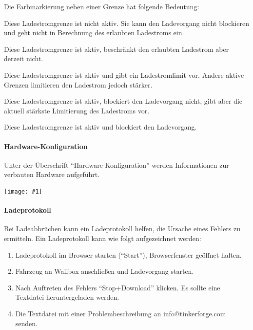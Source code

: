 \documentclass[a4paper,10pt]{article}
\newcommand{\gfx}[1]{\texttt{[image: \#1]}}
\begin{document}
\begin{multicols*}{2}
    Die Farbmarkierung neben einer Grenze hat folgende Bedeutung:
    \begin{description}[labelindent=0.5cm, leftmargin=0.5cm]
     \item[\textbf{\textcolor{mygray}{Grau}}] Diese Ladestromgrenze ist nicht aktiv. Sie kann den Ladevorgang nicht blockieren und geht nicht in Berechnung des erlaubten Ladestroms ein.
     \item[\textbf{\textcolor{mygreen}{Grün}}] Diese Ladestromgrenze ist aktiv, beschränkt den erlaubten Ladestrom aber derzeit nicht.
     \item[\textbf{\textcolor{myblue}{Blau}}] Diese Ladestromgrenze ist aktiv und gibt ein Ladestromlimit vor. Andere aktive Grenzen limitieren den Ladestrom jedoch stärker.
     \item[\textbf{\textcolor{myorange}{Gelb}}] Diese Ladestromgrenze ist aktiv, blockiert den Ladevorgang nicht, gibt aber die aktuell stärkste Limitierung des Ladestroms vor.
     \item[\textbf{\textcolor{myred}{Rot}}] Diese Ladestromgrenze ist aktiv und blockiert den Ladevorgang.
    \end{description}

    \paragraph{Hardware-Konfiguration}
    Unter der Überschrift \enquote{Hard\-ware-Konfiguration} werden Informationen
    zur verbauten Hardware aufgeführt.

    \gfx{./img_warp3/resized/web_evse}

    \paragraph{Ladeprotokoll}
    Bei Ladeabbrüchen kann ein Ladeprotokoll
    helfen, die Ursache eines Fehlers zu ermitteln. Ein Ladeprotokoll kann
    wie folgt aufgezeichnet werden:
    \begin{enumerate}
        \item Ladeprotokoll im Browser starten (\enquote{Start}), Browserfenster geöffnet halten.
        \item Fahrzeug an Wallbox anschließen und Ladevorgang starten.
        \item Nach Auftreten des Fehlers \enquote{Stop+Download} klicken. Es
        sollte eine Textdatei heruntergeladen werden.
        \item Die Textdatei mit einer Problembeschreibung an \nohyphens{info@tinkerforge.com} senden.
    \end{enumerate}


\end{multicols*}
\end{document}
